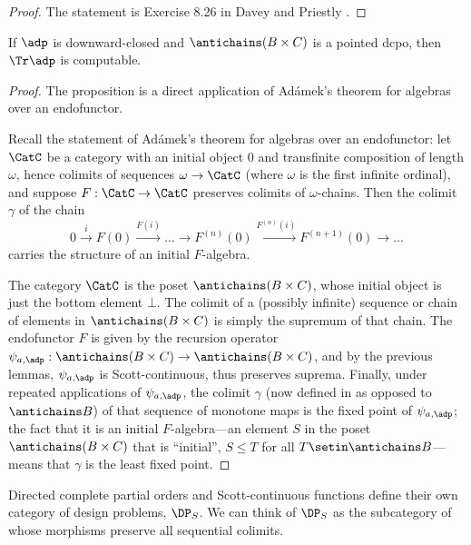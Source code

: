\begin{proof}
    The statement is Exercise 8.26 in Davey and Priestly \citeXXX.
\end{proof}




\begin{proposition}
    If $\adp$ is downward-closed and $\antichains (B \times C)$ is a pointed dcpo, then $\Tr \adp$ is computable.
\end{proposition}

\begin{proof}
    The proposition is a direct application of Ad\'amek's theorem for algebras over an endofunctor.

    Recall the statement of Ad\'amek's theorem for algebras over an endofunctor: let $\CatC$ be a category with an initial object $0$ and transfinite composition of length $\omega$, hence colimits of sequences $\omega \to \CatC$ (where $\omega$ is the first infinite ordinal), and suppose $F: \CatC \to \CatC$ preserves colimits of $\omega$-chains.
    Then the colimit $\gamma$ of the chain \[0 \overset{i}{\to} F(0) \overset{F(i)}{\to} \ldots \to F^{(n)}(0) \overset{F^{(n)}(i)}{\to} F^{(n+1)}(0) \to \ldots\] carries the structure of an initial $F$-algebra.

    The category $\CatC$ is the poset $\antichains (B \times C)$, whose initial object is just the bottom element $\bot$.
    The colimit of a (possibly infinite) sequence or chain of elements in $\antichains (B\times C)$ is simply the supremum of that chain.
    The endofunctor $F$ is given by the recursion operator $\psi_{a,\adp} : \antichains (B\times C) \to \antichains (B\times C)$, and by the previous lemmas, $\psi_{a,\adp}$ is Scott-continuous, thus preserves suprema.
    Finally, under repeated applications of $\psi_{a,\adp}$, the colimit $\gamma$ (now defined in \Pos as opposed to $\antichains B$) of that sequence of monotone maps is the fixed point of $\psi_{a,\adp}$; the fact that it is an initial $F$-algebra---\ie  an element $S$ in the poset $\antichains (B\times C)$ that is ``initial'', \ie  $S \leq T$ for all $T \setin \antichains B$---means that $\gamma$ is the least fixed point.
\end{proof}
Directed complete partial orders and Scott-continuous functions define their own category of design problems, $\DP_S$.
We can think of $\DP_S$ as the subcategory of \DP whose morphisms preserve all sequential colimits.

